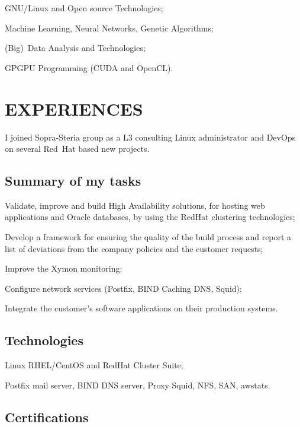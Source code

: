 \item{\bdot} GNU/Linux and Open source Technologies;
\item{\bdot} Machine Learning, Neural Networks, Genetic Algorithms;
\item{\bdot} (Big)~Data Analysis and Technologies;
\item{\bdot} GPGPU Programming (CUDA and OpenCL).

\section{EXPERIENCES}

I joined Sopra-Steria group as a L3 consulting Linux administrator and DevOps on
several Red~Hat based new projects.

\vskip -2mm
\subsection{Summary of my tasks}

\item{\bdot} Validate, improve and build High Availability solutions,
   for hosting web applications and Oracle databases, by using the RedHat clustering 
   technologies;
\item{\bdot} Develop a framework for ensuring the quality of the build process
   and report a list of deviations from the company policies and the customer requests;
\item{\bdot} Improve the Xymon monitoring;
\item{\bdot} Configure network services (Postfix, BIND Caching DNS, Squid);
\item{\bdot} Integrate the customer's software applications on their production systems.

\vskip -2mm
\subsection{Technologies}

\item{\bdot} Linux RHEL/CentOS and RedHat Cluster Suite;
\item{\bdot} Postfix mail server, BIND DNS server, Proxy Squid, NFS, SAN, awstats.

\subsection{Certifications}

